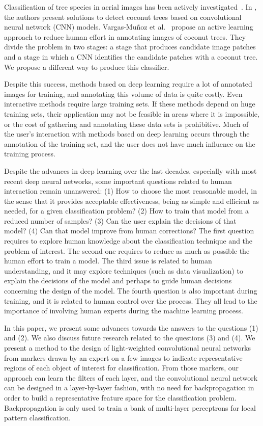 \documentclass[a4paper,conference]{IEEEtran}
\begin{document}
Classification of tree species in aerial images has been actively investigated~\cite{fassnacht2016review}. In \cite{puttemans2018comparing, aparna2018cnn}, the authors present solutions to detect coconut trees based on convolutional neural network (CNN) models. Vargas-Muñoz et al.~\cite{8899005} propose an active learning approach to reduce human effort in annotating images of coconut trees. They divide the problem in two stages: a stage that produces candidate image patches and a stage in which a CNN identifies the candidate patches with a coconut tree. We propose a different way to produce this classifier.  

Despite this success, methods based on deep learning require a lot of annotated images for training, and annotating this volume of data is quite costly. Even interactive methods require large training sets. If these methods depend on huge training sets, their application may not be feasible in areas where it is impossible, or the cost of gathering and annotating these data sets is prohibitive. Much of the user's interaction with methods based on deep learning occurs through the annotation of the training set, and the user does not have much influence on the training process.

Despite the advances in deep learning over the last decades, especially with most recent deep neural networks, some important questions related to human interaction remain unanswered: (1) How to choose the most reasonable model, in the sense that it provides acceptable effectiveness, being as simple and efficient as needed, for a given classification problem? (2) How to train that model from a reduced number of samples?  (3) Can the user explain the decisions of that model? (4) Can that model improve from human corrections? The first question requires to explore human knowledge about the classification technique and the problem of interest. The second one requires to reduce as much as possible the human effort to train a model. The third issue is related to human understanding, and it may explore techniques (such as data visualization) to explain the decisions of the model and perhaps to guide human decisions concerning the design of the model. The fourth question is also important during training, and it is related to human control over the process. They all lead to the importance of involving human experts during the machine learning process.

In this paper, we present some advances towards the answers to the questions (1) and (2). We also discuss future research related to the questions (3) and (4). We present a method to the design of light-weighted convolutional neural networks from markers drawn by an expert on a few images to indicate representative regions of each object of interest for classification. From those markers, our approach can learn the filters of each layer, and the convolutional neural network can be designed in a layer-by-layer fashion, with no need for backpropagation in order to build a representative feature space for the classification problem. Backpropagation is only used to train a bank of multi-layer perceptrons for local pattern classification.
\end{document}
